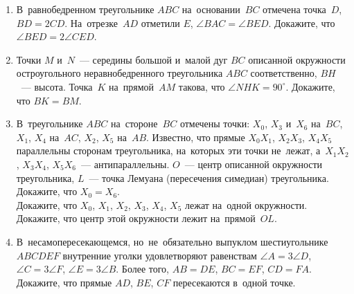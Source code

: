 \begin{enumerate}
\item
В~равнобедренном треугольнике $ABC$ на~основании~$BC$ отмечена точка~$D$,
$BD = 2 CD$.
На~отрезке~$AD$ отметили $E$, $\angle BAC = \angle BED$.
Докажите, что $\angle BED = 2 \angle CED$.

\item
Точки $M$ и~$N$~--- середины большой и~малой дуг $BC$ описанной окружности
остроугольного неравнобедренного треугольника $ABC$ соответственно,
$BH$~--- высота.
Точка~$K$ на~прямой~$AM$ такова, что $\angle NHK = 90^{\circ}$.
Докажите, что $BK = BM$.

\item
В~треугольнике $ABC$ на~стороне~$BC$ отмечены точки:
$X_0$, $X_3$ и~$X_6$ на~$BC$,
$X_1$, $X_4$ на~$AC$, $X_2$, $X_5$ на~$AB$.
Известно, что прямые $X_0 X_1$, $X_2 X_3$, $X_4 X_5$ параллельны сторонам
треугольника, на~которых эти точки не~лежат,
а~$X_1 X_2$, $X_3 X_4$, $X_5 X_6$~--- антипараллельны.
$O$~--- центр описанной окружности треугольника, $L$~--- точка Лемуана
(пересечения симедиан) треугольника.
\\
\subproblem
Докажите, что $X_0 = X_6$.
\\
\subproblem
Докажите, что $X_0$, $X_1$, $X_2$, $X_3$, $X_4$, $X_5$ лежат на~одной
окружности.
\\
\subproblem
Докажите, что центр этой окружности лежит на~прямой~$OL$.

\item
В~несамопересекающемся, но~не~обязательно выпуклом шестиугольнике $ABCDEF$
внутренние уголки удовлетворяют равенствам
$\angle A = 3 \angle D$, $\angle C = 3 \angle F$, $\angle E = 3 \angle B$.
Более того, $AB = DE$, $BC = EF$, $CD = FA$.
Докажите, что прямые $AD$, $BE$, $CF$ пересекаются в~одной точке.

\end{enumerate}

